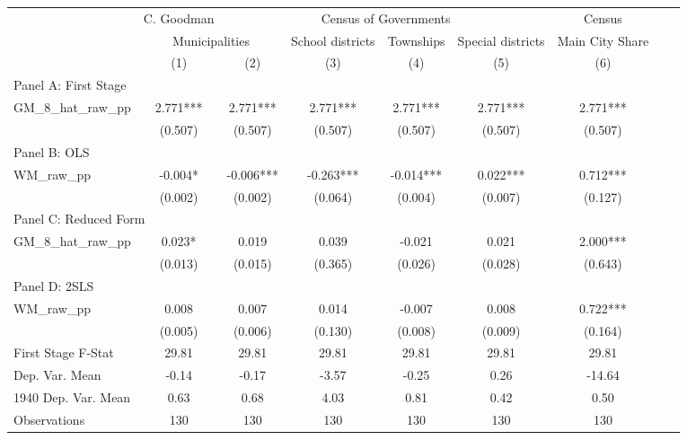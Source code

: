  \begin{tabular}{l*{8}{c}} \toprule
&\multicolumn{1}{c}{C. Goodman}&\multicolumn{4}{c}{Census of Governments}&\multicolumn{1}{c}{Census}\\\cmidrule(lr){2-2}\cmidrule(lr){3-6}\cmidrule(lr){7-7}
&\multicolumn{2}{c}{Municipalities}&\multicolumn{1}{c}{School districts}&\multicolumn{1}{c}{Townships}&\multicolumn{1}{c}{Special districts}&\multicolumn{1}{c}{Main City Share}\\\cmidrule(lr){2-3}\cmidrule(lr){4-6}\cmidrule(lr){7-7}
&\multicolumn{1}{c}{(1)}&\multicolumn{1}{c}{(2)}&\multicolumn{1}{c}{(3)}&\multicolumn{1}{c}{(4)}&\multicolumn{1}{c}{(5)}&\multicolumn{1}{c}{(6)}\\
\cmidrule(lr){1-7}
\multicolumn{6}{l}{Panel A: First Stage}\\
\cmidrule(lr){1-7}
GM\_8\_hat\_raw\_pp &    2.771***&    2.771***&    2.771***&    2.771***&    2.771***&    2.771***\\
                &  (0.507)   &  (0.507)   &  (0.507)   &  (0.507)   &  (0.507)   &  (0.507)   \\
\cmidrule(lr){1-7}
\multicolumn{6}{l}{Panel B: OLS}\\
\cmidrule(lr){1-7}
WM\_raw\_pp       &   -0.004*  &   -0.006***&   -0.263***&   -0.014***&    0.022***&    0.712***\\
                &  (0.002)   &  (0.002)   &  (0.064)   &  (0.004)   &  (0.007)   &  (0.127)   \\
\cmidrule(lr){1-7}
\multicolumn{6}{l}{Panel C: Reduced Form}\\
\cmidrule(lr){1-7}
GM\_8\_hat\_raw\_pp &    0.023*  &    0.019   &    0.039   &   -0.021   &    0.021   &    2.000***\\
                &  (0.013)   &  (0.015)   &  (0.365)   &  (0.026)   &  (0.028)   &  (0.643)   \\
\cmidrule(lr){1-7}
\multicolumn{6}{l}{Panel D: 2SLS}\\
\cmidrule(lr){1-7}
WM\_raw\_pp       &    0.008   &    0.007   &    0.014   &   -0.007   &    0.008   &    0.722***\\
                &  (0.005)   &  (0.006)   &  (0.130)   &  (0.008)   &  (0.009)   &  (0.164)   \\
\midrule
First Stage F-Stat&    29.81   &    29.81   &    29.81   &    29.81   &    29.81   &    29.81   \\
Dep. Var. Mean  &    -0.14   &    -0.17   &    -3.57   &    -0.25   &     0.26   &   -14.64   \\
1940 Dep. Var. Mean&     0.63   &     0.68   &     4.03   &     0.81   &     0.42   &     0.50   \\
Observations    &      130   &      130   &      130   &      130   &      130   &      130   \\
       \bottomrule \end{tabular}
